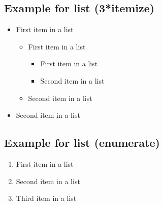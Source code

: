 \documentclass[paper=a4, fontsize=11pt]{scrartcl}
\numberwithin{equation}{section}		%
\numberwithin{figure}{section}			%
\numberwithin{table}{section}				%
\begin{document}
\subsection{Example for list (3*itemize)}
\begin{itemize}
	\item First item in a list 
		\begin{itemize}
		\item First item in a list 
			\begin{itemize}
			\item First item in a list 
			\item Second item in a list 
			\end{itemize}
		\item Second item in a list 
		\end{itemize}
	\item Second item in a list 
\end{itemize}

\subsection{Example for list (enumerate)}
\begin{enumerate}
	\item First item in a list 
	\item Second item in a list 
	\item Third item in a list
\end{enumerate}
\end{document}
